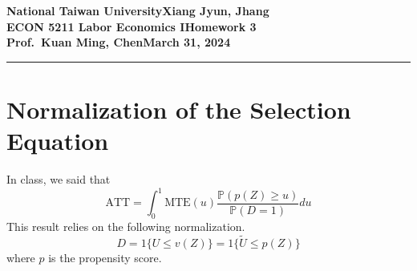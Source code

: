 \documentclass[11pt]{article}
\newcommand{\myname}{Xiang Jyun, Jhang}
\newcommand{\assignment}{Homework 3}
\newcommand{\duedate}{March 31, 2024}
\newcommand{\pr}{\mathbb{P}}
\begin{document}
\textbf{National Taiwan University}\hfill\textbf{\myname}\\[0.01in]
\textbf{ECON 5211 Labor Economics I}\hfill\textbf{\assignment}\\[0.01in]
\textbf{Prof.\ Kuan Ming, Chen}\hfill\textbf{\duedate}\\
\smallskip\hrule\bigskip


\section{Normalization of the Selection Equation}

    In class, we said that 
    \[
        \text{ATT} = \int_{0}^{1} \text{MTE}(u) \frac{\pr(p(Z)\geq u)}{\pr(D=1)}du 
    \] 
    This result relies on the following normalization.
    \[ 
        D = 1\{U \leq v(Z)\} = 1\{\tilde{U} \leq p(Z)\} 
    \]
    where $p$ is the propensity score.
\end{document}
